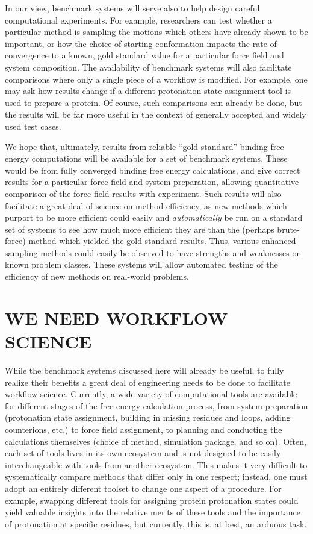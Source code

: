 \documentclass[aps,pre,twocolumn,nofootinbib,superscriptaddress,10pt, final,tightenlines]{revtex4-1}
\begin{document}
In our view, benchmark systems will serve also to help design careful computational experiments. 
For example, researchers can test whether a particular method is sampling the motions which others have already shown to be important, or how the choice of starting conformation impacts the rate of convergence to a known, gold standard value for a particular force field and system composition. 
The availability of benchmark systems will also facilitate comparisons where only a single piece of a workflow is modified. 
For example, one may ask how results change if a different protonation state assignment tool is used to prepare a protein.
Of course, such comparisons can already be done, but the results will be far more useful in the context of generally accepted and widely used test cases. 

We hope that, ultimately, results from reliable ``gold standard'' binding free energy computations will be available for a set of benchmark systems. 
These would be from fully converged binding free energy calculations, and give correct results for a particular force field and system preparation, allowing quantitative comparison of the force field results with experiment. 
Such results will also facilitate a great deal of science on method efficiency, as new methods which purport to be more efficient could easily and \emph{automatically} be run on a standard set of systems to see how much more efficient they are than the (perhaps brute-force) method which yielded the gold standard results. 
Thus, various enhanced sampling methods could easily be observed to have strengths and weaknesses on known problem classes. 
These systems will allow automated testing of the efficiency of new methods on real-world problems. 

\section{WE NEED WORKFLOW SCIENCE}
While the benchmark systems discussed here will already be useful, to fully realize their benefits a great deal of engineering needs to be done to facilitate workflow science. 
Currently, a wide variety of computational tools are available for different stages of the free energy calculation process, from system preparation (protonation state assignment, building in missing residues and loops, adding counterions, etc.) to force field assignment, to planning and conducting the calculations themselves (choice of method, simulation package, and so on). 
Often, each set of tools lives in its own ecosystem and is not designed to be easily interchangeable with tools from another ecosystem.  
This makes it very difficult to systematically compare methods that differ only in one respect; instead, one must adopt an entirely different toolset to change one aspect of a procedure. 
For example, swapping different tools for assigning protein protonation states could yield valuable insights into the relative merits of these tools and the importance of protonation at specific residues, but currently, this is, at best, an arduous task.
\end{document}
